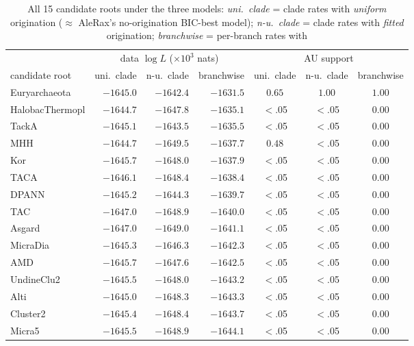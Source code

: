 \documentclass[11pt]{article}
\begin{document}
\begin{table}[h]
\centering\footnotesize
\setlength{\tabcolsep}{4.5pt}
\begin{tabular}{lrrrccc}
\toprule
 & \multicolumn{3}{c}{data $\log L$ ($\times10^3$ nats)} & \multicolumn{3}{c}{AU support} \\
\cmidrule(lr){2-4}\cmidrule(lr){5-7}
candidate root & uni.\ clade & n-u.\ clade & branchwise & uni.\ clade & n-u.\ clade & branchwise \\
\midrule
Euryarchaeota   & $-1645.0$ & $-1642.4$ & $\mathbf{-1631.5}$ & $0.65$ & $\mathbf{1.00}$ & $\mathbf{1.00}$ \\
HalobacThermopl & $-1644.7$ & $-1647.8$ & $-1635.1$ & $<$.05 & $<$.05 & 0.00 \\
TackA           & $-1645.1$ & $-1643.5$ & $-1635.5$ & $<$.05 & $<$.05 & 0.00 \\
MHH             & $-1644.7$ & $-1649.5$ & $-1637.7$ & $0.48$ & $<$.05 & 0.00 \\
Kor             & $-1645.7$ & $-1648.0$ & $-1637.9$ & $<$.05 & $<$.05 & 0.00 \\
TACA            & $-1646.1$ & $-1648.4$ & $-1638.4$ & $<$.05 & $<$.05 & 0.00 \\
DPANN           & $-1645.2$ & $-1644.3$ & $-1639.7$ & $<$.05 & $<$.05 & 0.00 \\
TAC             & $-1647.0$ & $-1648.9$ & $-1640.0$ & $<$.05 & $<$.05 & 0.00 \\
Asgard          & $-1647.0$ & $-1649.0$ & $-1641.1$ & $<$.05 & $<$.05 & 0.00 \\
MicraDia        & $-1645.3$ & $-1646.3$ & $-1642.3$ & $<$.05 & $<$.05 & 0.00 \\
AMD             & $-1645.7$ & $-1647.6$ & $-1642.5$ & $<$.05 & $<$.05 & 0.00 \\
UndineClu2      & $-1645.5$ & $-1648.0$ & $-1643.2$ & $<$.05 & $<$.05 & 0.00 \\
Alti            & $-1645.0$ & $-1648.3$ & $-1643.3$ & $<$.05 & $<$.05 & 0.00 \\
Cluster2        & $-1645.4$ & $-1648.4$ & $-1643.7$ & $<$.05 & $<$.05 & 0.00 \\
Micra5          & $-1645.5$ & $-1648.9$ & $-1644.1$ & $<$.05 & $<$.05 & 0.00 \\
\bottomrule
\end{tabular}
\caption{All 15 candidate roots under the three models: \emph{uni.\ clade} = clade rates with
\emph{uniform} origination ($\approx$ AleRax's no-origination BIC-best model); \emph{n-u.\
clade} = clade rates with \emph{fitted} origination; \emph{branchwise} = per-branch rates with
}
\end{table}
\end{document}
